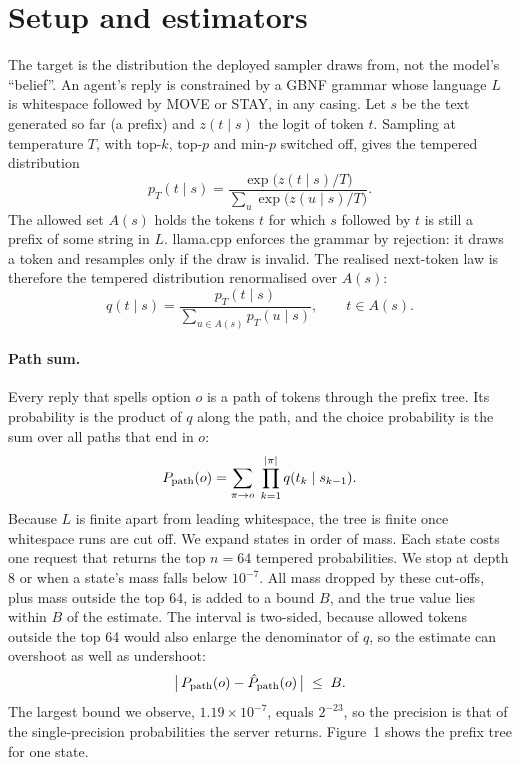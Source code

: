 \section{Setup and estimators}
\label{sec:setup}

The target is the distribution the deployed sampler draws from, not the model's ``belief''.
An agent's reply is constrained by a GBNF grammar whose language $L$ is whitespace followed by MOVE or STAY, in any casing.
Let $s$ be the text generated so far (a prefix) and $z(t\mid s)$ the logit of token $t$.
Sampling at temperature $T$, with top-$k$, top-$p$ and min-$p$ switched off, gives the tempered distribution
\begin{equation}
p_T(t\mid s)=\frac{\exp\big(z(t\mid s)/T\big)}{\sum_{u}\exp\big(z(u\mid s)/T\big)}.
\end{equation}
The allowed set $A(s)$ holds the tokens $t$ for which $s$ followed by $t$ is still a prefix of some string in $L$.
llama.cpp enforces the grammar by rejection: it draws a token and resamples only if the draw is invalid.
The realised next-token law is therefore the tempered distribution renormalised over $A(s)$:
\begin{equation}
q(t\mid s)=\frac{p_T(t\mid s)}{\sum_{u\in A(s)}p_T(u\mid s)},\qquad t\in A(s).
\end{equation}

\paragraph{Path sum.}
Every reply that spells option $o$ is a path of tokens through the prefix tree.
Its probability is the product of $q$ along the path, and the choice probability is the sum over all paths that end in $o$:
\begin{equation}
P_{\text{path}}(o)=\sum_{\pi\to o}\;\prod_{k=1}^{|\pi|}q(t_k\mid s_{k-1}).
\end{equation}
Because $L$ is finite apart from leading whitespace, the tree is finite once whitespace runs are cut off.
We expand states in order of mass.
Each state costs one request that returns the top $n=64$ tempered probabilities.
We stop at depth 8 or when a state's mass falls below $10^{-7}$.
All mass dropped by these cut-offs, plus mass outside the top 64, is added to a bound $B$, and the true value lies within $B$ of the estimate.
The interval is two-sided, because allowed tokens outside the top 64 would also enlarge the denominator of $q$, so the estimate can overshoot as well as undershoot:
\begin{equation}
\big|\,P_{\text{path}}(o)-\hat P_{\text{path}}(o)\,\big|\;\le\;B.
\end{equation}
The largest bound we observe, $1.19\times10^{-7}$, equals $2^{-23}$, so the precision is that of the single-precision probabilities the server returns.
Figure~1 shows the prefix tree for one state. 

